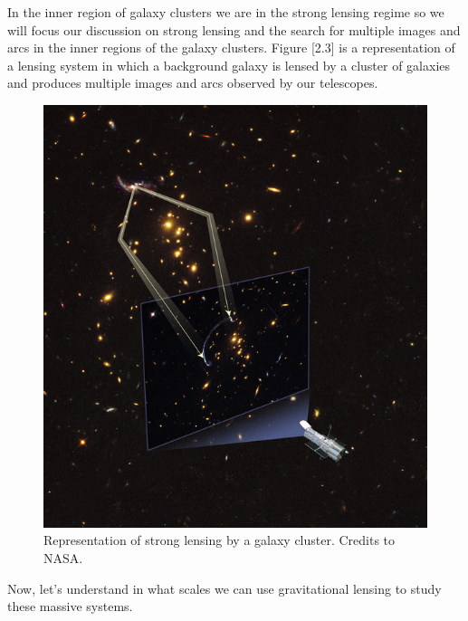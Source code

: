 In the inner region of galaxy clusters we are in the strong lensing regime so we will focus our discussion on strong lensing and the search for multiple images and arcs in the inner regions of the galaxy clusters. Figure [2.3] is a representation of a lensing system in which a background galaxy is lensed by a cluster of galaxies and produces multiple images and arcs observed by our telescopes. 

\begin{figure}[H]
\centering
\includegraphics[width=12cm]{images/lensing.jpg}
\caption[Strong Lensing representation]{Representation of strong lensing by a galaxy cluster. Credits to NASA.}
\end{figure}

Now, let's understand in what scales we can use gravitational lensing to study these massive systems.